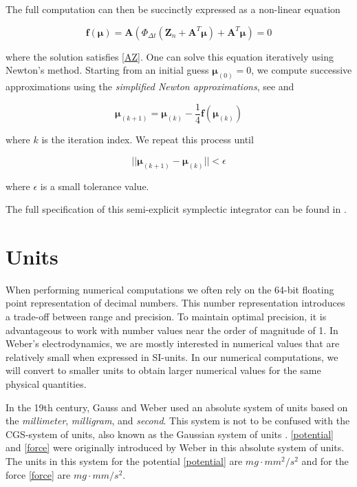 \documentclass[12pt,a4paper]{article}
\theoremstyle{definition}
\theoremstyle{remark}
\begin{document}
The full computation can then be succinctly expressed as a non-linear equation

\begin{equation}
    \mathbf{f}(\boldsymbol{\mu}) = \mathbf{A} (\Phi_{\Delta t}(\mathbf{Z}_n + \mathbf{A}^T \boldsymbol{\mu}) + \mathbf{A}^T \boldsymbol{\mu}) = 0
\end{equation}

where the solution satisfies \eqref{AZ}. One can solve this equation iteratively using Newton's method. Starting from an initial guess $\boldsymbol{\mu}_{(0)} = 0$, we compute successive approximations using the \textit{simplified Newton approximations}, see \citep{Jayawardana2023} and \citep{Hairer2006}

\begin{equation}
    \boldsymbol{\mu}_{(k+1)} = \boldsymbol{\mu}_{(k)} - \frac{1}{4} \mathbf{f}(\boldsymbol{\mu}_{(k)})
\end{equation}

where $k$ is the iteration index. We repeat this process until

\begin{equation}
    ||\boldsymbol{\mu}_{(k+1)} - \boldsymbol{\mu}_{(k)}|| < \epsilon
\end{equation}

where $\epsilon$ is a small tolerance value.

The full specification of this semi-explicit symplectic integrator can be found in \citet{Jayawardana2023}.

\section{Units}\label{units}
When performing numerical computations we often rely on the 64-bit floating point representation of decimal numbers. This number representation introduces a trade-off between range and precision. To maintain optimal precision, it is advantageous to work with number values near the order of magnitude of 1. In Weber's electrodynamics, we are mostly interested in numerical values that are relatively small when expressed in SI-units. In our numerical computations, we will convert to smaller units to obtain larger numerical values for the same physical quantities.

In the 19th century, Gauss and Weber used an absolute system of units based on the \textit{millimeter}, \textit{milligram}, and \textit{second}. This system is not to be confused with the CGS-system of units, also known as the Gaussian system of units \citep{assis-weber-vol1}. \eqref{potential} and \eqref{force} were originally introduced by Weber in this absolute system of units. The units in this system for the potential \eqref{potential} are $mg \cdot mm^2 / s^2$ and for the force \eqref{force} are $mg \cdot mm / s^2$.
\end{document}
